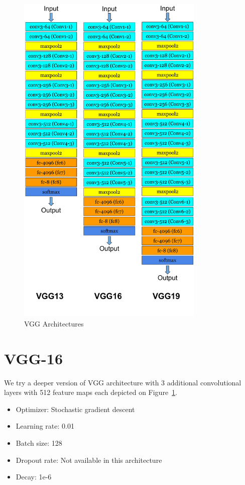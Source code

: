\begin{figure}[]
    \begin{center}
    \includegraphics[width=0.8\textwidth]{images/VGG13_16_19.pdf}
    \end{center}
    \caption{VGG Architectures} \label{fig:vgg13_16_19}
\end{figure}

\section{VGG-16}
We try a deeper version of VGG architecture with 3 additional convolutional layers with 512 feature maps each depicted on Figure~\ref{fig:vgg13_16_19}. 

\begin{itemize}
  \item Optimizer: Stochastic gradient descent
  \item Learning rate: 0.01
  \item Batch size: 128
  \item Dropout rate: Not available in this architecture
  \item Decay: 1e-6
\end{itemize}

